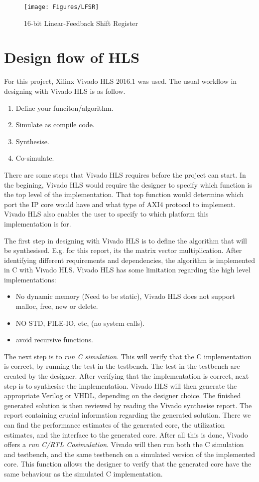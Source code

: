 \begin{figure} 
\texttt{[image: Figures/LFSR]}
\caption{16-bit Linear-Feedback Shift Register}
	\label{fig:LFSR}
\end{figure}


\section{Design flow of HLS}
For this project, Xilinx Vivado HLS 2016.1 was used. The usual workflow in designing with Vivado HLS is as follow. 
\begin{enumerate}
\item Define your funciton/algorithm.
\item Simulate as compile code. 
\item Synthesise.
\item Co-simulate.
\end{enumerate}

There are some steps that Vivado HLS requires before the project can start. In the begining, Vivado HLS would require the designer to specify which function is the top level of the implementation. That top function would determine which port the IP core would have and what type of AXI4 protocol to implement. Vivado HLS also enables the user to specify to which platform this implementation is for.


The first step in designing with Vivado HLS is to define the algorithm that will be synthesised. E.g. for this report, its the matrix vector multiplication. After identifying different requirements and dependencies, the algorithm is implemented in C with Vivado HLS. Vivado HLS has some limitation regarding the high level implementations:
\begin{itemize}
\item No dynamic memory (Need to be static), Vivado HLS does not support malloc, free, new or delete. 
\item NO STD, FILE-IO, etc, (no system calls). 
\item avoid recursive functions. 
\end{itemize}

The next step is to \textit{run C simulation}. This will verify that the C implementation is correct, by running the test in the testbench. The test in the testbench are created by the designer. After verifying that the implementation is correct, next step is to synthesise the implementation. Vivado HLS will then generate the appropriate Verilog or VHDL, depending on  the designer choice. The finished generated solution is then reviewed by reading the Vivado synthesise report. The report containing crucial information regarding the generated solution. There we can find the performance estimates of the generated core, the utilization estimates, and the interface to the generated core. After all this is done, Vivado offers a \textit{run C/RTL Cosimulation}. Vivado will then run both the C simulation and testbench, and the same testbench on a simulated version of the implemented core. This function allows the designer to verify that the generated core have the same behaviour as the simulated C implementation.

